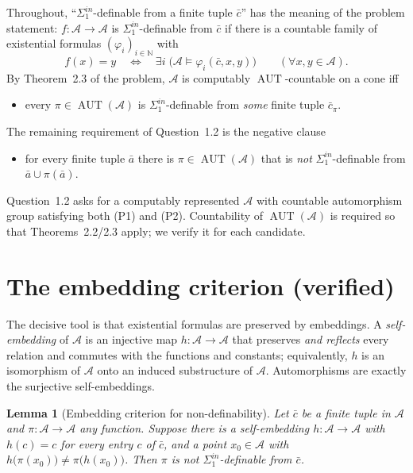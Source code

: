 \documentclass[12pt,fullpage]{article}
\newtheorem{lemma}[theorem]{Lemma}
\theoremstyle{definition}
\newcommand{\A}{\mathcal{A}}
\newcommand{\N}{\mathbb{N}}
\newcommand{\AUT}{\operatorname{AUT}}
\renewcommand{\phi}{\varphi}
\begin{document}
Throughout, ``$\Sigma^{in}_1$-definable from a finite tuple $\bar c$'' has the
meaning of the problem statement: $f\colon\A\to\A$ is
$\Sigma^{in}_1$-definable from $\bar c$ if there is a countable family of
existential formulas $(\phi_i)_{i\in\N}$ with
\begin{equation}\tag{$\ast$}\label{star}
f(x)=y\quad\Longleftrightarrow\quad \exists i\;\bigl(\A\models\phi_i(\bar c,x,y)\bigr)
\qquad(\forall x,y\in\A).
\end{equation}
By Theorem~2.3 of the problem, $\A$ is computably $\AUT$-countable on a cone iff
\begin{itemize}
\item[\textbf{(P1)}] every $\pi\in\AUT(\A)$ is $\Sigma^{in}_1$-definable from
  \emph{some} finite tuple $\bar c_\pi$.
\end{itemize}
The remaining requirement of Question~1.2 is the negative clause
\begin{itemize}
\item[\textbf{(P2)}] for every finite tuple $\bar a$ there is
  $\pi\in\AUT(\A)$ that is \emph{not} $\Sigma^{in}_1$-definable from
  $\bar a\cup\pi(\bar a)$.
\end{itemize}
Question~1.2 asks for a computably represented $\A$ with countable
automorphism group satisfying both (P1) and (P2).  Countability of $\AUT(\A)$
is required so that Theorems~2.2/2.3 apply; we verify it for each candidate.

\section{The embedding criterion (verified)}\label{sec:crit}

The decisive tool is that existential formulas are preserved by embeddings.  A
\emph{self-embedding} of $\A$ is an injective map $h\colon\A\to\A$ that
preserves \emph{and reflects} every relation and commutes with the functions and
constants; equivalently, $h$ is an isomorphism of $\A$ onto an induced
substructure of $\A$.  Automorphisms are exactly the surjective self-embeddings.

\begin{lemma}[Embedding criterion for non-definability]\label{lem:embcrit}
Let $\bar c$ be a finite tuple in $\A$ and $\pi\colon\A\to\A$ any function.
Suppose there is a self-embedding $h\colon\A\to\A$ with $h(c)=c$ for every entry
$c$ of $\bar c$, and a point $x_0\in\A$ with
$h\bigl(\pi(x_0)\bigr)\neq\pi\bigl(h(x_0)\bigr)$.
Then $\pi$ is \emph{not} $\Sigma^{in}_1$-definable from $\bar c$.
\end{lemma}
\end{document}

